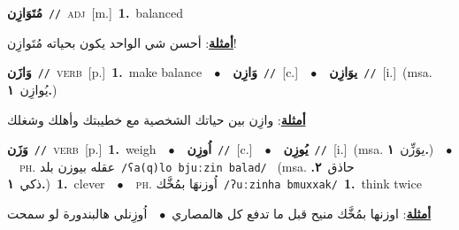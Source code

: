 \documentclass[10pt,a4paper,twoside]{article} %
\begin{document}
\begin{multicols}{2}
{\setlength\topsep{0pt}\textbf{\foreignlanguage{arabic}{مُتَوَازِن}}\ {\color{gray}\texttt{//}\color{black}}\ \textsc{adj}\ [m.]\ \textbf{1.}~balanced\  \begin{flushright}\color{gray}\foreignlanguage{arabic}{\textbf{\underline{\foreignlanguage{arabic}{أمثلة}}}: أحسن شي الواحد يكون بحياته مُتَوازِن!}\end{flushright}\color{black}} \vspace{2mm}

{\setlength\topsep{0pt}\textbf{\foreignlanguage{arabic}{وَازَن}}\ {\color{gray}\texttt{//}\color{black}}\ \textsc{verb}\ [p.]\ \textbf{1.}~make balance\ \ $\bullet$\ \ \setlength\topsep{0pt}\textbf{\foreignlanguage{arabic}{وَازِن}}\ {\color{gray}\texttt{//}\color{black}}\ [c.]\ \ $\bullet$\ \ \setlength\topsep{0pt}\textbf{\foreignlanguage{arabic}{يوَازِن}}\ {\color{gray}\texttt{//}\color{black}}\ [i.]\ \color{gray}(msa. \foreignlanguage{arabic}{يُوازِن}~\foreignlanguage{arabic}{\textbf{١.}})\color{black}\  \begin{flushright}\color{gray}\foreignlanguage{arabic}{\textbf{\underline{\foreignlanguage{arabic}{أمثلة}}}: وازِن بين حياتك الشخصية مع خطيبتك وأهلك وشغلك}\end{flushright}\color{black}} \vspace{2mm}

{\setlength\topsep{0pt}\textbf{\foreignlanguage{arabic}{وَزَن}}\ {\color{gray}\texttt{//}\color{black}}\ \textsc{verb}\ [p.]\ \textbf{1.}~weigh\ \ $\bullet$\ \ \setlength\topsep{0pt}\textbf{\foreignlanguage{arabic}{اُوزِن}}\ {\color{gray}\texttt{//}\color{black}}\ [c.]\ \ $\bullet$\ \ \setlength\topsep{0pt}\textbf{\foreignlanguage{arabic}{يُوزِن}}\ {\color{gray}\texttt{//}\color{black}}\ [i.]\ \color{gray}(msa. \foreignlanguage{arabic}{يوَزِّن}~\foreignlanguage{arabic}{\textbf{١.}})\color{black}\ \ $\bullet$\ \ \textsc{ph.} \color{gray} \foreignlanguage{arabic}{عقله بيوزن بلد}\color{black}\ {\color{gray}\texttt{/{\sffamily ʕa(q)lo bjuːzin balad}/}\color{black}}\ \color{gray} (msa. \foreignlanguage{arabic}{حاذق}~\foreignlanguage{arabic}{\textbf{٢.}}  \foreignlanguage{arabic}{ذكي}~\foreignlanguage{arabic}{\textbf{١.}})\color{black}\ \textbf{1.}~clever\ \ $\bullet$\ \ \textsc{ph.} \color{gray} \foreignlanguage{arabic}{اُوزنهَا بمُخَّك}\color{black}\ {\color{gray}\texttt{/{\sffamily ʔuːzinha bmuxxak}/}\color{black}}\ \textbf{1.}~think twice\  \begin{flushright}\color{gray}\foreignlanguage{arabic}{\textbf{\underline{\foreignlanguage{arabic}{أمثلة}}}: اوزنها بمُخَّك منيح قبل ما تدفع كل هالمصاري\ $\bullet$\ \  اُوزِنلي هالبندورة لو سمحت}\end{flushright}\color{black}} \vspace{2mm}


\end{multicols}
\end{document}
